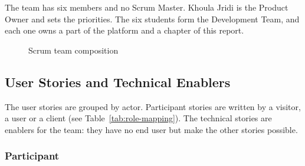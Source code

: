 \documentclass[12pt,a4paper]{report}
\begin{document}
The team has six members and no Scrum Master. Khoula Jridi is the Product Owner and sets the priorities. The six students form the Development Team, and each one owns a part of the platform and a chapter of this report.

\begin{figure}[htbp]
\centering
{}
\caption{Scrum team composition}
\label{fig:scrum-team}
\end{figure}

\subsection{User Stories and Technical Enablers}
\label{subsec:user-stories}

The user stories are grouped by actor. Participant stories are written by a visitor, a user or a client (see Table~\ref{tab:role-mapping}). The technical stories are enablers for the team: they have no end user but make the other stories possible.

\subsubsection*{Participant}
\end{document}
